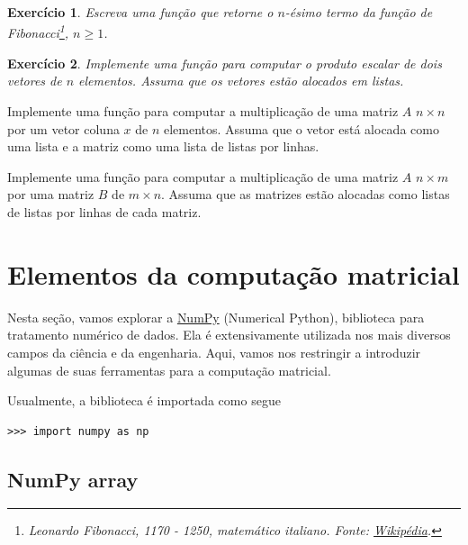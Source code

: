 \documentclass[12pt]{article}
\newtheorem{exr}{Exercício}[section]
\begin{document}
\begin{exr}
  Escreva uma função que retorne o $n$-ésimo termo da função de Fibonacci\footnote{Leonardo Fibonacci, 1170 - 1250, matemático italiano. Fonte: \href{https://pt.wikipedia.org/wiki/Leonardo\_Fibonacci}{Wikipédia}.}, $n\geq 1$. 
\end{exr}

\begin{exr}
  Implemente uma função para computar o produto escalar de dois vetores de $n$ elementos. Assuma que os vetores estão alocados em listas.
\end{exr}

\begin{exer}
  Implemente uma função para computar a multiplicação de uma matriz $A$ $n\times n$ por um vetor coluna $x$ de $n$ elementos. Assuma que o vetor está alocada como uma lista e a matriz como uma lista de listas por linhas.
\end{exer}

\begin{exer}
  Implemente uma função para computar a multiplicação de uma matriz $A$ $n\times m$ por uma matriz $B$ de $m\times n$. Assuma que as matrizes estão alocadas como listas de listas por linhas de cada matriz.
\end{exer}

\section{Elementos da computação matricial}\label{sec_mat}

Nesta seção, vamos explorar a \href{https://numpy.org/}{NumPy} (Numerical Python), biblioteca para tratamento numérico de dados. Ela é extensivamente utilizada nos mais diversos campos da ciência e da engenharia. Aqui, vamos nos restringir a introduzir algumas de suas ferramentas para a computação matricial.

Usualmente, a biblioteca é importada como segue
\begin{lstlisting}
>>> import numpy as np
\end{lstlisting}

\subsection{NumPy array}
\end{document}
